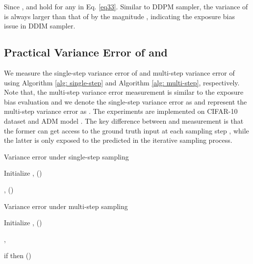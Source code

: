\documentclass{article} \usepackage{iclr2024_conference,times}
\begin{document}
Since ,  and  hold for any  in Eq. \ref{eq33}. Similar to DDPM sampler, the variance of  is always larger than that of  by the magnitude , indicating the exposure bias issue in DDIM sampler.




\subsection{Practical Variance Error of \texorpdfstring{}{Lg} and \texorpdfstring{}{Lg}}
\label{Append:2}

We measure the single-step variance error of  and multi-step variance error of  using Algorithm \ref{alg: single-step} and Algorithm \ref{alg: multi-step}, respectively. Note that, the multi-step variance error measurement is similar to the exposure bias  evaluation and we denote the single-step variance error as  and represent the multi-step variance error as . The experiments are implemented on CIFAR-10 \citep{cifar10} dataset and ADM model \citep{ADM}. The key difference between  and  measurement is that the former can get access to the ground truth input  at each sampling step , while the latter is only exposed to the predicted  in the iterative sampling process.

\begin{minipage}{0.48\textwidth}
\begin{algorithm}[H]
    \centering
    \caption{Variance error under single-step sampling}
    \label{alg: single-step}
    \begin{algorithmic}[1]
        \STATE Initialize ,  ()
        
        \FOR{}
        \REPEAT
        \STATE , 
        \STATE 
        \STATE  \quad ()
        \STATE 
        \ENDFOR
        
        
        \FOR{}
        \STATE 
        \STATE 
        \ENDFOR
    \end{algorithmic}
\end{algorithm}
\end{minipage}
\hfill
\begin{minipage}{0.48\textwidth}
\begin{algorithm}[H]
    \centering
    \caption{Variance error under multi-step sampling}
    \label{alg: multi-step}
    \begin{algorithmic}[1]
        \STATE Initialize ,  ()
        
        \REPEAT
        \STATE , 
        \STATE 
        
        \FOR{}
        \STATE if  then 
        \STATE  \quad ()
        \STATE  
        \ENDFOR
        
        \FOR{}
        \STATE 
        \STATE 
        \ENDFOR
    \end{algorithmic}
\end{algorithm}
\end{minipage}
\end{document}
